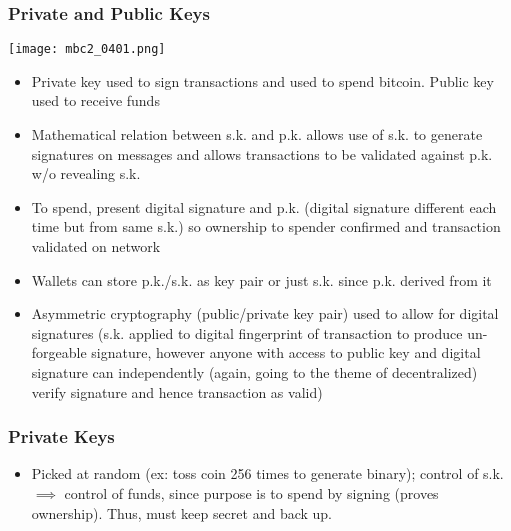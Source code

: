 \documentclass[english, 11pt]{article}
\begin{document}
\subsubsection{Private and Public Keys}
\begin{tcolorbox}
\begin{minipage}{0.4\linewidth}
\centering
    \texttt{[image: mbc2\_0401.png]}
    \captionsetup{justification=centering}
\end{minipage}\hfil
\begin{minipage}{0.6\linewidth}
\begin{itemize}
    \item Private key used to sign transactions and used to spend bitcoin. Public key used to receive funds
    \item Mathematical relation between s.k. and p.k. allows use of s.k. to generate signatures on messages and allows transactions to be validated against p.k. w/o revealing s.k.
    \item To spend, present digital signature and p.k. (digital signature different each time but from same s.k.) so ownership to spender confirmed and transaction validated on network
    \item Wallets can store p.k./s.k. as key pair or just s.k. since p.k. derived from it
    \item Asymmetric cryptography (public/private key pair) used to allow for digital signatures (s.k. applied to digital fingerprint of transaction to produce un-forgeable signature, however anyone with access to public key and digital signature can independently (again, going to the theme of decentralized) verify signature and hence transaction as valid)
\end{itemize}
\end{minipage}
\end{tcolorbox}

\subsubsection{Private Keys}
\begin{itemize}
    \item Picked at random (ex: toss coin 256 times to generate binary); control of s.k. $\implies$ control of funds, since purpose is to spend by signing (proves ownership). Thus, must keep secret and back up.
\end{itemize}
\end{document}
